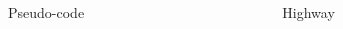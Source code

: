 \documentclass[xcolor=x11names,12pt]{beamer}
\begin{document}
\begin{frame}
  \begin{columns}
    \begin{column}{.48\textwidth}
      \begin{block}{Pseudo-code}
        \centering
        \fontsize{11pt}{11pt}\selectfont
      \end{block}
    \end{column}
    \begin{column}{.48\textwidth}
      \begin{block}{Highway}
        \centering
        \fontsize{11pt}{11pt}\selectfont

\end{block}
\end{column}
\end{columns}
\end{frame}
\end{document}
